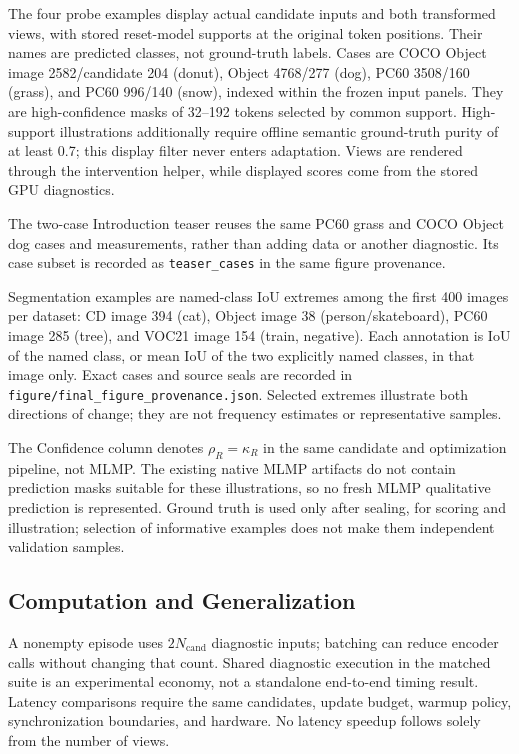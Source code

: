 The four probe examples display actual candidate inputs and both transformed views, with stored reset-model supports at the original token positions. Their names are predicted classes, not ground-truth labels. Cases are COCO Object image 2582/candidate 204 (donut), Object 4768/277 (dog), PC60 3508/160 (grass), and PC60 996/140 (snow), indexed within the frozen input panels. They are high-confidence masks of 32--192 tokens selected by common support. High-support illustrations additionally require offline semantic ground-truth purity of at least 0.7; this display filter never enters adaptation. Views are rendered through the intervention helper, while displayed scores come from the stored GPU diagnostics.

The two-case Introduction teaser reuses the same PC60 grass and COCO Object dog cases and measurements, rather than adding data or another diagnostic. Its case subset is recorded as \texttt{teaser\_cases} in the same figure provenance.

Segmentation examples are named-class IoU extremes among the first 400 images per dataset: CD image 394 (cat), Object image 38 (person/skateboard), PC60 image 285 (tree), and VOC21 image 154 (train, negative). Each annotation is IoU of the named class, or mean IoU of the two explicitly named classes, in that image only. Exact cases and source seals are recorded in \texttt{figure/final\_figure\_provenance.json}. Selected extremes illustrate both directions of change; they are not frequency estimates or representative samples.

The Confidence column denotes $\rho_R=\kappa_R$ in the same candidate and optimization pipeline, not MLMP. The existing native MLMP artifacts do not contain prediction masks suitable for these illustrations, so no fresh MLMP qualitative prediction is represented. Ground truth is used only after sealing, for scoring and illustration; selection of informative examples does not make them independent validation samples.

\subsection{Computation and Generalization}
A nonempty episode uses $2N_{\mathrm{cand}}$ diagnostic inputs; batching can reduce encoder calls without changing that count. Shared diagnostic execution in the matched suite is an experimental economy, not a standalone end-to-end timing result. Latency comparisons require the same candidates, update budget, warmup policy, synchronization boundaries, and hardware. No latency speedup follows solely from the number of views.

